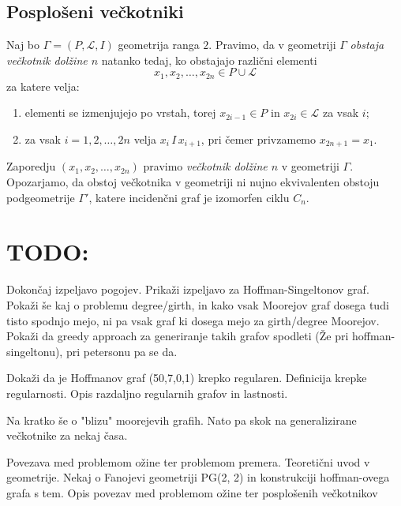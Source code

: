 \documentclass[fin1, tisk]{fmfdelo}
\begin{document}
\subsection{Posplošeni večkotniki}

\begin{definicija}[Večkotnik]
Naj bo $\Gamma = (P, \mathcal{L}, I)$ geometrija ranga $2$. 
Pravimo, da v geometriji $\Gamma$ \emph{obstaja večkotnik dolžine $n$} 
natanko tedaj, ko obstajajo različni elementi 
\[
x_1, x_2, \ldots, x_{2n} \in P \cup \mathcal{L}
\]
za katere velja:
\begin{enumerate}
  \item elementi se izmenjujejo po vrstah, torej $x_{2i-1} \in P$ in $x_{2i} \in \mathcal{L}$ za vsak $i$;
  \item za vsak $i = 1, 2, \ldots, 2n$ velja $x_i \, I \, x_{i+1}$, pri čemer privzamemo $x_{2n+1} = x_1$.
\end{enumerate}
Zaporedju $(x_1, x_2, \ldots, x_{2n})$ pravimo \emph{večkotnik dolžine $n$} 
v geometriji $\Gamma$.
%
Opozarjamo, da obstoj večkotnika v geometriji ni nujno
ekvivalenten obstoju podgeometrije $\Gamma'$, katere incidenčni
graf je izomorfen ciklu $C_n$.
\end{definicija}

\begin{definicija}
    
\end{definicija}



\section{TODO:}
Dokončaj izpeljavo pogojev. Prikaži izpeljavo za Hoffman-Singeltonov graf.
Pokaži še kaj o problemu degree/girth, in kako vsak Moorejov graf dosega 
tudi tisto spodnjo mejo, ni pa vsak graf ki dosega mejo za girth/degree Moorejov.
Pokaži da greedy approach za generiranje takih grafov spodleti (Že pri hoffman-singeltonu), 
pri petersonu pa se da.

Dokaži da je Hoffmanov graf (50,7,0,1) krepko regularen. Definicija 
krepke regularnosti. Opis razdaljno regularnih grafov in lastnosti.

Na kratko še o "blizu" moorejevih grafih. Nato pa skok na generalizirane večkotnike 
za nekaj časa.

Povezava med problemom ožine ter problemom premera. Teoretični uvod 
v geometrije. Nekaj o Fanojevi geometriji PG(2, 2) in konstrukciji 
hoffman-ovega grafa s tem. Opis povezav med problemom ožine ter 
posplošenih večkotnikov

\end{document}
